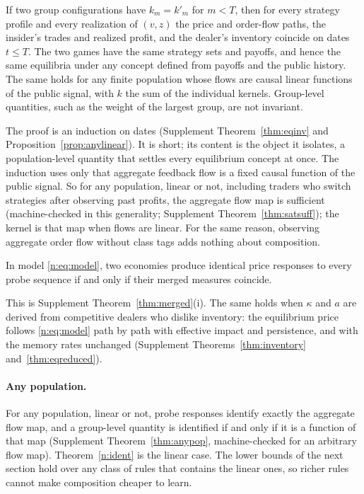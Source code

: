 \begin{theorem}\label{n:suff}
If two group configurations have $k_m=k'_m$ for $m<T$, then for every strategy profile and every realization of $(v,z)$ the price and order-flow paths, the insider's trades and realized profit, and the dealer's inventory coincide on dates $t\le T$. The two games have the same strategy sets and payoffs, and hence the same equilibria under any concept defined from payoffs and the public history. The same holds for any finite population whose flows are causal linear functions of the public signal, with $k$ the sum of the individual kernels. Group-level quantities, such as the weight of the largest group, are not invariant.
\end{theorem}

The proof is an induction on dates (Supplement Theorem~\ref{thm:eqinv} and Proposition~\ref{prop:anylinear}). It is short; its content is the object it isolates, a population-level quantity that settles every equilibrium concept at once. The induction uses only that aggregate feedback flow is a fixed causal function of the public signal. So for any population, linear or not, including traders who switch strategies after observing past profits, the aggregate flow map is sufficient (machine-checked in this generality; Supplement Theorem~\ref{thm:satsuff}); the kernel is that map when flows are linear. For the same reason, observing aggregate order flow without class tags adds nothing about composition.

\begin{theorem}\label{n:ident}
In model \eqref{n:eq:model}, two economies produce identical price responses to every probe sequence if and only if their merged measures coincide.
\end{theorem}

This is Supplement Theorem~\ref{thm:merged}(i). The same holds when $\kappa$ and $a$ are derived from competitive dealers who dislike inventory: the equilibrium price follows \eqref{n:eq:model} path by path with effective impact and persistence, and with the memory rates unchanged (Supplement Theorems~\ref{thm:inventory} and~\ref{thm:eqreduced}).

\paragraph{Any population.} For any population, linear or not, probe responses identify exactly the aggregate flow map, and a group-level quantity is identified if and only if it is a function of that map (Supplement Theorem~\ref{thm:anypop}, machine-checked for an arbitrary flow map). Theorem~\ref{n:ident} is the linear case. The lower bounds of the next section hold over any class of rules that contains the linear ones, so richer rules cannot make composition cheaper to learn.

